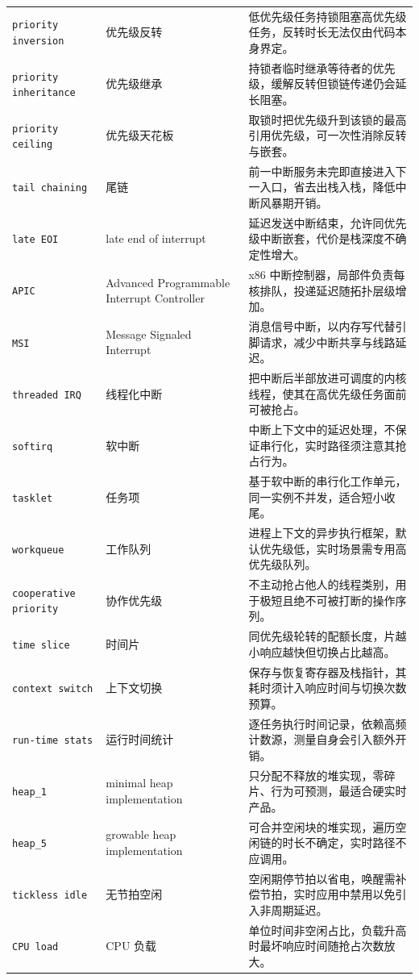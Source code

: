 \documentclass[12pt,a4paper,fontset=fandol]{ctexbook}
\newcommand{\Tp}[1]{\texttt{#1}}
\begin{document}
\begin{longtable}{@{} >{\raggedright\arraybackslash}p{} >{\raggedright\arraybackslash}p{} >{\raggedright\arraybackslash}p{}@{}}
\Tp{priority inversion} & 优先级反转 & 低优先级任务持锁阻塞高优先级任务，反转时长无法仅由代码本身界定。 \\
\Tp{priority inheritance} & 优先级继承 & 持锁者临时继承等待者的优先级，缓解反转但锁链传递仍会延长阻塞。 \\
\Tp{priority ceiling} & 优先级天花板 & 取锁时把优先级升到该锁的最高引用优先级，可一次性消除反转与嵌套。 \\
\Tp{tail chaining} & 尾链 & 前一中断服务未完即直接进入下一入口，省去出栈入栈，降低中断风暴期开销。 \\
\Tp{late EOI} & late end of interrupt & 延迟发送中断结束，允许同优先级中断嵌套，代价是栈深度不确定性增大。 \\
\Tp{APIC} & Advanced Programmable Interrupt Controller & x86 中断控制器，局部件负责每核排队，投递延迟随拓扑层级增加。 \\
\Tp{MSI} & Message Signaled Interrupt & 消息信号中断，以内存写代替引脚请求，减少中断共享与线路延迟。 \\
\Tp{threaded IRQ} & 线程化中断 & 把中断后半部放进可调度的内核线程，使其在高优先级任务面前可被抢占。 \\
\Tp{softirq} & 软中断 & 中断上下文中的延迟处理，不保证串行化，实时路径须注意其抢占行为。 \\
\Tp{tasklet} & 任务项 & 基于软中断的串行化工作单元，同一实例不并发，适合短小收尾。 \\
\Tp{workqueue} & 工作队列 & 进程上下文的异步执行框架，默认优先级低，实时场景需专用高优先级队列。 \\
\Tp{cooperative priority} & 协作优先级 & 不主动抢占他人的线程类别，用于极短且绝不可被打断的操作序列。 \\
\Tp{time slice} & 时间片 & 同优先级轮转的配额长度，片越小响应越快但切换占比越高。 \\
\Tp{context switch} & 上下文切换 & 保存与恢复寄存器及栈指针，其耗时须计入响应时间与切换次数预算。 \\
\Tp{run-time stats} & 运行时间统计 & 逐任务执行时间记录，依赖高频计数源，测量自身会引入额外开销。 \\
\Tp{heap\_1} & minimal heap implementation & 只分配不释放的堆实现，零碎片、行为可预测，最适合硬实时产品。 \\
\Tp{heap\_5} & growable heap implementation & 可合并空闲块的堆实现，遍历空闲链的时长不确定，实时路径不应调用。 \\
\Tp{tickless idle} & 无节拍空闲 & 空闲期停节拍以省电，唤醒需补偿节拍，实时应用中禁用以免引入非周期延迟。 \\
\Tp{CPU load} & CPU 负载 & 单位时间非空闲占比，负载升高时最坏响应时间随抢占次数放大。 \\

\end{longtable}
\end{document}

